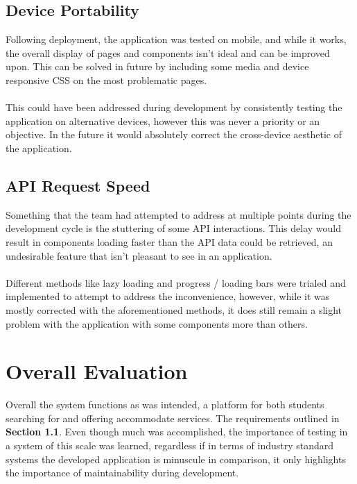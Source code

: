 \subsection{Device Portability}
Following deployment, the application was tested on mobile, and while it works, the overall display of pages and components isn't ideal and can be improved upon. This can be solved in future by including some media and device responsive CSS on the most problematic pages.

\paragraph{}
This could have been addressed during development by consistently testing the application on alternative devices, however this was never a priority or an objective. In the future it would absolutely correct the cross-device aesthetic of the application.

\subsection{API Request Speed}
Something that the team had attempted to address at multiple points during the development cycle is the stuttering of some API interactions. This delay would result in components loading faster than the API data could be retrieved, an undesirable feature that isn't pleasant to see in an application. 

\paragraph{}
Different methods like lazy loading and progress / loading bars were trialed and implemented to attempt to address the inconvenience, however, while it was mostly corrected with the aforementioned methods, it does still remain a slight problem with the application with some components more than others.

\section{Overall Evaluation}
Overall the system functions as was intended, a platform for both students searching for and offering accommodate services. The requirements outlined in \textbf{Section 1.1}. Even though much was accomplished, the importance of testing in a system of this scale was learned, regardless if in terms of industry standard systems the developed application is minuscule in comparison, it only highlights the importance of maintainability during development.

